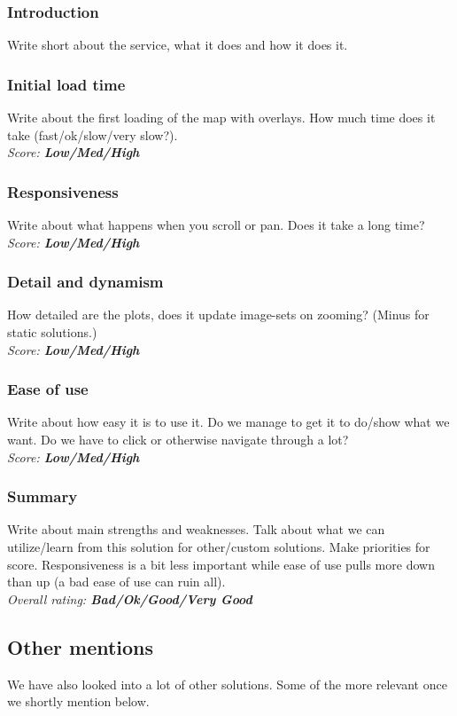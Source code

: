 \documentclass[11pt,a4paper,titlepage,oneside]{report}
\begin{document}
\subsubsection{Introduction}
Write short about the service, what it does and how it does it.
\subsubsection{Initial load time}
Write about the first loading of the map with overlays. How much time does it take (fast/ok/slow/very slow?).
\\ \emph{Score: \textbf{Low/Med/High}}
\subsubsection{Responsiveness}
Write about what happens when you scroll or pan. Does it take a long time?
\\ \emph{Score: \textbf{Low/Med/High}}
\subsubsection{Detail and dynamism}
How detailed are the plots, does it update image-sets on zooming? (Minus for static solutions.) 
\\ \emph{Score: \textbf{Low/Med/High}}
\subsubsection{Ease of use}
Write about how easy it is to use it. Do we manage to get it to do/show what we want. Do we have to click or otherwise navigate through a lot?
\\ \emph{Score: \textbf{Low/Med/High}}
\subsubsection{Summary}
Write about main strengths and weaknesses. Talk about what we can utilize/learn from this solution for other/custom solutions. Make priorities for score. Responsiveness is a bit less important while ease of use pulls more down than up (a bad ease of use can ruin all).
\\ \emph{Overall rating: \textbf{Bad/Ok/Good/Very Good}}

\subsection{Other mentions}
We have also looked into a lot of other solutions. Some of the more relevant once we shortly mention below.
\end{document}

